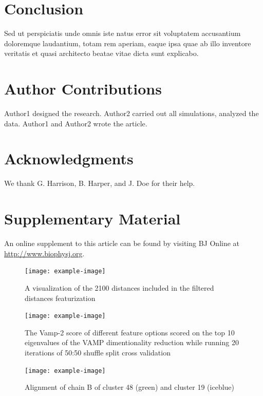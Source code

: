 \documentclass{biophys-new}
\begin{document}
\section*{Conclusion}

Sed ut perspiciatis unde omnis iste natus error sit voluptatem accusantium doloremque laudantium, totam rem aperiam, eaque ipsa quae ab illo inventore veritatis et quasi architecto beatae vitae dicta sunt explicabo. 

\section*{Author Contributions}

Author1 designed the research. Author2 carried out all simulations, analyzed the data. Author1 and Author2 wrote the article. 

\section*{Acknowledgments}

We thank G. Harrison, B. Harper, and J. Doe for their help.




\section*{Supplementary Material}

An online supplement to this article can be found by visiting BJ Online at \url{http://www.biophysj.org}.

\begin{figure}[feature-image]
\centering
\texttt{[image: example-image]}
\caption{A visualization of the 2100 distances included in the filtered distances featurization}
\label{fig:view}
\end{figure}

\begin{figure}[feature-selection]
\centering
\texttt{[image: example-image]}
\caption{The Vamp-2 score of different feature options scored on the top 10 eigenvalues of the VAMP dimentionality reduction while running 20 iterations of 50:50 shuffle split cross validation}
\label{fig:view}
\end{figure}

\begin{figure}[alignment-linker-helix]
\centering
\texttt{[image: example-image]}
\caption{Alignment of chain B of cluster 48 (green) and cluster 19 (iceblue)}
\label{fig:view}
\end{figure}
\end{document}
